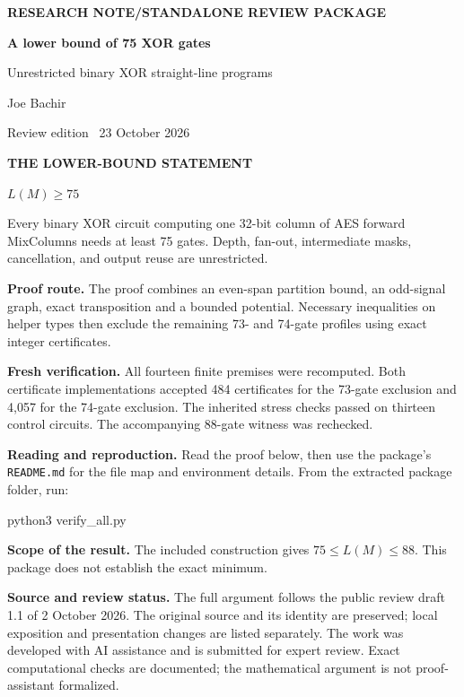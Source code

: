 \documentclass[11pt,letterpaper]{article}
\begin{document}
\thispagestyle{plain}
\vspace*{-3pt}
{\sffamily\small\bfseries\color{accent} RESEARCH NOTE\quad /\quad STANDALONE REVIEW PACKAGE}\par
\vspace{10pt}
{\sffamily\fontsize{25}{30}\selectfont\bfseries\color{ink} A lower bound of 75 XOR gates}\par
\vspace{6pt}
{\sffamily\large\color{muted} Unrestricted binary XOR straight-line programs}\par
\vspace{11pt}
{\large Joe Bachir}\par
{\sffamily\small\color{muted} Review edition \textbullet\ 23 October 2026}\par
\begin{statementbox}
{\sffamily\bfseries\color{accent} THE LOWER-BOUND STATEMENT}\par
\vspace{3pt}
{\Large $L(M)\ge 75$}\par
Every binary XOR circuit computing one 32-bit column of AES forward MixColumns needs at least 75 gates. Depth, fan-out, intermediate masks, cancellation, and output reuse are unrestricted.
\end{statementbox}
\textbf{Proof route.} The proof combines an even-span partition bound, an odd-signal graph, exact transposition and a bounded potential. Necessary inequalities on helper types then exclude the remaining 73- and 74-gate profiles using exact integer certificates.\par
\textbf{Fresh verification.} All fourteen finite premises were recomputed. Both certificate implementations accepted 484 certificates for the 73-gate exclusion and 4,057 for the 74-gate exclusion. The inherited stress checks passed on thirteen control circuits. The accompanying 88-gate witness was rechecked.\par
\textbf{Reading and reproduction.} Read the proof below, then use the package's \texttt{README.md} for the file map and environment details. From the extracted package folder, run:\par
\vspace{3pt}
{\ttfamily\small python3 verify\_all.py}\par
\vspace{6pt}
\textbf{Scope of the result.} The included construction gives $75\le L(M)\le88$. This package does not establish the exact minimum.\par
\textbf{Source and review status.} The full argument follows the public review draft 1.1 of 2 October 2026. The original source and its identity are preserved; local exposition and presentation changes are listed separately. The work was developed with AI assistance and is submitted for expert review. Exact computational checks are documented; the mathematical argument is not proof-assistant formalized.\par
\end{document}
